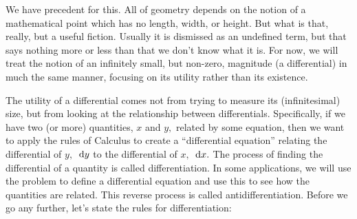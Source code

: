 We have precedent for this.  All of geometry depends on the notion of
a mathematical point which has no length, width, or height. But what
is that, really, but a useful fiction. Usually it is dismissed as an
undefined term, but that says nothing more or less than that we don't
know what it is.  For now, we will treat the notion of an infinitely
small, but non-zero, magnitude (a differential) in much the same
manner, focusing on its utility rather than its existence.

The utility of a differential comes not from trying to measure its
(infinitesimal) size, but from looking at the relationship between
differentials.  Specifically, if we have two (or more) quantities, $x$
and $y,$ related by some equation, then we want to apply the rules of
Calculus to create a ``differential equation'' relating the
differential of $y,$ $\thinspace{\rm d}y$ to the differential of $x,$ $\thinspace{\rm d}x.$ The
process of finding the differential of a quantity is called
differentiation.  In some applications, we will use the problem to
define a differential equation and use this to see how the quantities
are related. This reverse process is called antidifferentiation.
Before we go any further, let's state the rules for differentiation:

